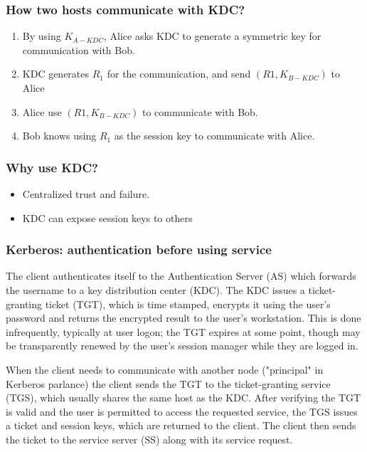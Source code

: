 \subsubsection{How two hosts communicate with KDC?}
\begin{enumerate}
    \item By using $K_{A-KDC}$, Alice asks KDC to generate a symmetric key for communication with Bob.
    \item KDC generates $R_1$ for the communication, and send $(R1, K_{B-KDC})$ to Alice
    \item Alice use $(R1, K_{B-KDC})$ to communicate with Bob.
    \item Bob knows using $R_1$ as the session key to communicate with Alice.
\end{enumerate}

\subsubsection{Why use KDC?}
\begin{itemize}
    \item Centralized trust and failure.
    \item KDC can expose session keys to others
\end{itemize}

\subsubsection{Kerberos: authentication before using service}
The client authenticates itself to the Authentication Server (AS) which forwards the username to a key distribution center (KDC). The KDC issues a ticket-granting ticket (TGT), which is time stamped, encrypts it using the user's password and returns the encrypted result to the user's workstation. This is done infrequently, typically at user logon; the TGT expires at some point, though may be transparently renewed by the user's session manager while they are logged in.

When the client needs to communicate with another node ("principal" in Kerberos parlance) the client sends the TGT to the ticket-granting service (TGS), which usually shares the same host as the KDC. After verifying the TGT is valid and the user is permitted to access the requested service, the TGS issues a ticket and session keys, which are returned to the client. The client then sends the ticket to the service server (SS) along with its service request.

